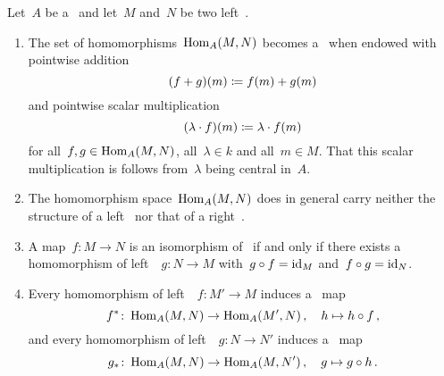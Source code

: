 \begin{remark}
  Let~$A$ be a~{\kalg} and let~$M$ and~$N$ be two left~{\Amods}.
  \begin{enumerate}
    \item
      The set of homomorphisms~$\operatorname{Hom}_A(M,N)$ becomes a~{\kmod} when endowed with pointwise addition
      \[
                  (f + g)(m)
        \coloneqq  f(m) + g(m)
      \]
      and pointwise scalar multiplication
      \[
                  (\lambda \cdot f)(m)
        \coloneqq  \lambda \cdot f(m)
      \]
      for all~$f, g \in \operatorname{Hom}_A(M,N)$, all~$\lambda \in k$ and all~$m \in M$.
      That this scalar multiplication is {\welldef} follows from~$\lambda$ being central in~$A$.
    \item
      The homomorphism space~$\operatorname{Hom}_A(M,N)$ does in general carry neither the structure of a left~{\Amod} nor that of a right~{\Amod}.
    \item
      A map~$f \colon M \to N$ is an isomorphism of~{\Amods} if and only if there exists a homomorphism of left~{\Amods}~$g \colon N \to M$ with~$g \circ f = \operatorname{id}_M$ and~$f \circ g = \operatorname{id}_N$.
    \item
      Every homomorphism of left~{\Amods}~$f \colon M' \to M$ induces a~{\klin} map
      \[
                f^*
        \colon  \operatorname{Hom}_A(M, N)
        \to     \operatorname{Hom}_A(M', N) \,,
        \quad   h
        \mapsto h \circ f \,,
      \]
      and every homomorphism of left~{\Amods}~$g \colon N \to N'$ induces a~{\klin} map
      \[
                g_*
        \colon  \operatorname{Hom}_A(M, N)
        \to     \operatorname{Hom}_A(M, N') \,,
        \quad   g
        \mapsto g \circ h \,.
      \]
  \end{enumerate}
\end{remark}


